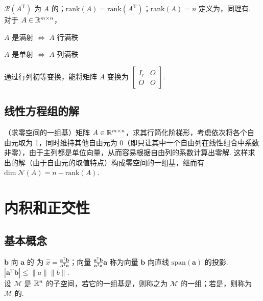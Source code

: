 \documentclass[./main.tex]{subfiles}
\begin{document}
$\mathcal{R}(A^{\mathrm{T}})$ 为 $A$ 的；$\mathrm{rank}(A)=\mathrm{rank}(A^{\mathrm{T}})$；$\mathrm{rank}(A)=n$ 定义为，同理有. \\

对于 $A\in\mathbb{R}^{m\times n}$，
\begin{itemize*}
    \item $A$ 是满射 $\iff$ $A$ 行满秩
    \item $A$ 是单射 $\iff$ $A$ 列满秩
\end{itemize*}

 通过行列初等变换，能将矩阵 $A$ 变换为 $\begin{bmatrix} I_r & O\\ O &O\end{bmatrix}$.

\subsection{线性方程组的解}
（求零空间的一组基）矩阵 $A\in\mathbb{R}^{m\times n}$，求其行简化阶梯形，考虑依次将各个自由元取为 1，同时维持其他自由元为 0（即只让其中一个自由列在线性组合中系数非零），由于主列都是单位向量，从而容易根据自由列的系数计算出零解. 这样求出的解（由于自由元的取值特点）构成零空间的一组基，继而有 $\mathrm{dim}\ \mathcal{N}(A)=n-\mathrm{rank}(A)$.

\section{内积和正交性}

\subsection{基本概念}

$\bm{b}$ 向 $\bm{a}$ 的 为 $\hat{x}=\frac{\bm{a}^{\mathrm{T}}\bm{b}}{\bm{a}^{\mathrm{T}}\bm{a}}$；向量 $\frac{\bm{a}^{\mathrm{T}}\bm{b}}{\bm{a}^{\mathrm{T}}\bm{a}}\bm{a}$ 称为向量 $\bm{b}$ 向直线 $\mathrm{span}(\bm{a})$ 的投影. \\

 $|\bm{a}^{\mathrm{T}}\bm{b}|\le \|a\|\|b\|$. \\

设 $\mathcal{M}$ 是 $\mathbb{R}^{n}$ 的子空间，若它的一组基是，则称之为 $\mathcal{M}$ 的一组；若是，则称为 $\mathcal{M}$ 的. \\
\end{document}
